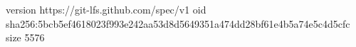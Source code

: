 version https://git-lfs.github.com/spec/v1
oid sha256:5bcb5ef4618023f993e242aa53d8d5649351a474dd28bf61e4b5a74e5c4d5cfc
size 5576
